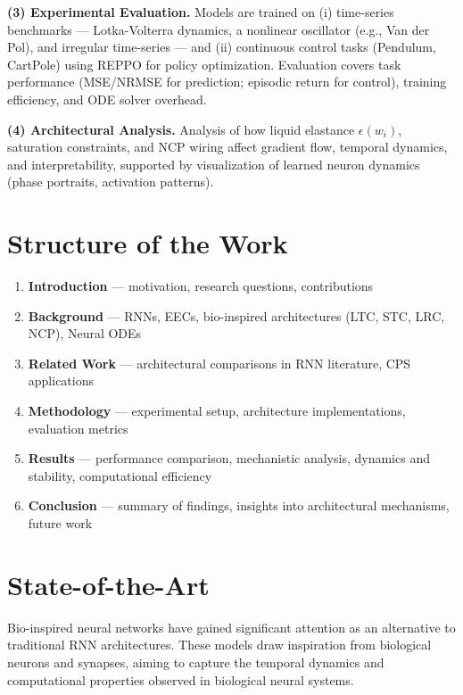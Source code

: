\documentclass[11pt,a4paper]{article}
\begin{document}
\textbf{(3) Experimental Evaluation.}
Models are trained on (i) time-series benchmarks --- Lotka-Volterra dynamics, a nonlinear oscillator (e.g., Van der Pol), and irregular time-series \cite{neuralode} --- and (ii) continuous control tasks (Pendulum, CartPole) using REPPO \cite{voelcker2025relative} for policy optimization. Evaluation covers task performance (MSE/NRMSE for prediction; episodic return for control), training efficiency, and ODE solver overhead.

\textbf{(4) Architectural Analysis.}
Analysis of how liquid elastance $\epsilon(w_i)$, saturation constraints, and NCP wiring affect gradient flow, temporal dynamics, and interpretability, supported by visualization of learned neuron dynamics (phase portraits, activation patterns).

\newpage
\section{Structure of the Work}

\begin{enumerate}
    \item \textbf{Introduction} --- motivation, research questions, contributions
    \item \textbf{Background} --- RNNs, EECs, bio-inspired architectures (LTC, STC, LRC, NCP), Neural ODEs
    \item \textbf{Related Work} --- architectural comparisons in RNN literature, CPS applications
    \item \textbf{Methodology} --- experimental setup, architecture implementations, evaluation metrics
    \item \textbf{Results} --- performance comparison, mechanistic analysis, dynamics and stability, computational efficiency
    \item \textbf{Conclusion} --- summary of findings, insights into architectural mechanisms, future work
\end{enumerate}

\newpage
\section{State-of-the-Art}

Bio-inspired neural networks have gained significant attention as an alternative to traditional RNN architectures. These models draw inspiration from biological neurons and synapses, aiming to capture the temporal dynamics and computational properties observed in biological neural systems.
\end{document}
